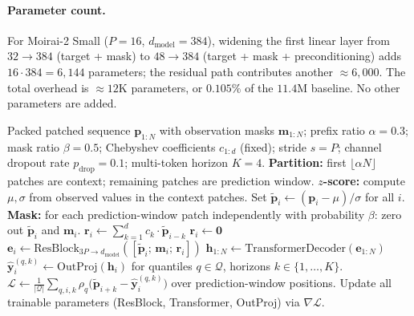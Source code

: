 \documentclass[11pt]{article}
\theoremstyle{plain}
\theoremstyle{definition}
\theoremstyle{remark}
\begin{document}
\paragraph{Parameter count.}
For Moirai-2 Small ($P = 16$, $d_{\text{model}} = 384$), widening the first linear layer from $32 \to 384$ (target + mask) to $48 \to 384$ (target + mask + preconditioning) adds $16 \cdot 384 = 6{,}144$ parameters; the residual path contributes another $\approx 6{,}000$. The total overhead is $\approx 12$K parameters, or $0.105\%$ of the $11.4$M baseline. No other parameters are added.

\begin{algorithm}[t]
\caption{Training with Polynomial Input Preconditioning}
\label{alg:poly-train}
\begin{algorithmic}[1]
\REQUIRE Packed patched sequence $\mathbf{p}_{1:N}$ with observation masks $\mathbf{m}_{1:N}$; prefix ratio $\alpha = 0.3$; mask ratio $\beta = 0.5$; Chebyshev coefficients $c_{1:d}$ (fixed); stride $s = P$; channel dropout rate $p_{\mathrm{drop}} = 0.1$; multi-token horizon $K = 4$.
\STATE \textbf{Partition:} first $\lfloor \alpha N \rfloor$ patches are context; remaining patches are prediction window.
\STATE \textbf{$z$-score:} compute $\mu, \sigma$ from observed values in the context patches. Set $\tilde{\mathbf{p}}_i \leftarrow (\mathbf{p}_i - \mu)/\sigma$ for all $i$.
\STATE \textbf{Mask:} for each prediction-window patch independently with probability $\beta$: zero out $\tilde{\mathbf{p}}_i$ and $\mathbf{m}_i$.
    \STATE $\mathbf{r}_i \leftarrow \sum_{k=1}^{d} c_k \cdot \tilde{\mathbf{p}}_{i-k}$ 
        \STATE $\mathbf{r}_i \leftarrow \mathbf{0}$ 
    \ENDIF
\ENDFOR
{}
    \STATE $\mathbf{e}_i \leftarrow \mathrm{ResBlock}_{3P \to d_{\mathrm{model}}}([\tilde{\mathbf{p}}_i;\, \mathbf{m}_i;\, \mathbf{r}_i])$
\ENDFOR
\STATE $\mathbf{h}_{1:N} \leftarrow \mathrm{TransformerDecoder}(\mathbf{e}_{1:N})$ 
\STATE $\hat{\mathbf{y}}_{i}^{(q,k)} \leftarrow \mathrm{OutProj}(\mathbf{h}_i)$ for quantiles $q \in \mathcal{Q}$, horizons $k \in \{1,\ldots,K\}$.
\STATE $\mathcal{L} \leftarrow \frac{1}{|\mathcal{Q}|} \sum_{q,i,k} \rho_q\!\bigl(\tilde{\mathbf{p}}_{i+k} - \hat{\mathbf{y}}_i^{(q,k)}\bigr)$ over prediction-window positions.
\STATE Update all trainable parameters (ResBlock, Transformer, OutProj) via $\nabla \mathcal{L}$.
\end{algorithmic}
\end{algorithm}
\end{document}
